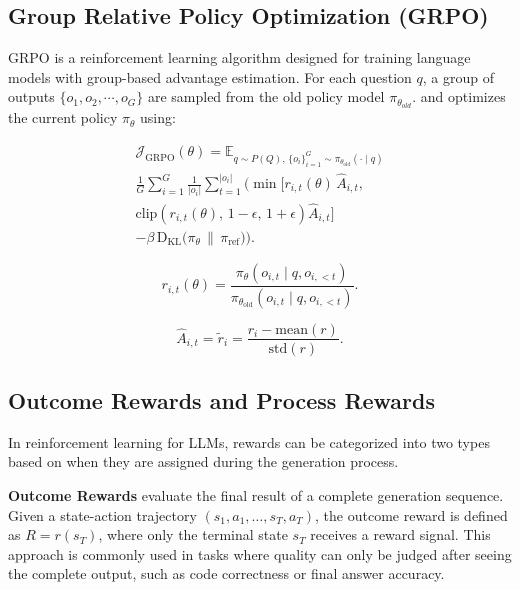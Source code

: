\subsection{Group Relative Policy Optimization (GRPO)}

GRPO \cite{Shao2024DeepSeekMathPT} is a reinforcement learning algorithm designed for training language models with group-based advantage estimation. For each question $q$, a group of outputs $\{o_1, o_2, \cdots, o_G\}$ are sampled from the old policy model $\pi_{\theta_{old}}$. and optimizes the current policy $\pi_{\theta}$ using:

\begin{equation}
\begin{aligned}
\mathcal{J}_{\mathrm{GRPO}}(\theta)
=
\mathbb{E}_{q \sim P(Q),\, \{o_i\}_{i=1}^{G} \sim \pi_{\theta_{\mathrm{old}}}(\cdot \mid q)}
\\
\frac{1}{G}
\sum_{i=1}^{G}
\frac{1}{|o_i|}
\sum_{t=1}^{|o_i|}
\Big(
\min \Big[
r_{i,t}(\theta)\,\hat{A}_{i,t},\,
\\
\mathrm{clip}\!\left(
r_{i,t}(\theta),\, 1-\epsilon,\, 1+\epsilon
\right)\hat{A}_{i,t}
\Big]
\\
-
\beta\, \mathrm{D}_{\mathrm{KL}}
\big(
\pi_\theta \,\|\, \pi_{\mathrm{ref}}
\big)
\Big).
\end{aligned}
\end{equation}


\begin{equation}
r_{i,t}(\theta)
=
\frac{
\pi_\theta(o_{i,t} \mid q, o_{i,<t})
}{
\pi_{\theta_{\mathrm{old}}}(o_{i,t} \mid q, o_{i,<t})
}.
\end{equation}

\begin{equation}
\hat{A}_{i,t}
=
\tilde{r}_i
=
\frac{
r_i - \mathrm{mean}(r)
}{
\mathrm{std}(r)
}.
\end{equation}

\subsection{Outcome Rewards and Process Rewards}

In reinforcement learning for LLMs, rewards can be categorized into two types based on when they are assigned during the generation process.

\textbf{Outcome Rewards} evaluate the final result of a complete generation sequence. Given a state-action trajectory $(s_1, a_1, \ldots, s_T, a_T)$, the outcome reward is defined as $R = r(s_T)$, where only the terminal state $s_T$ receives a reward signal. This approach is commonly used in tasks where quality can only be judged after seeing the complete output, such as code correctness or final answer accuracy.

